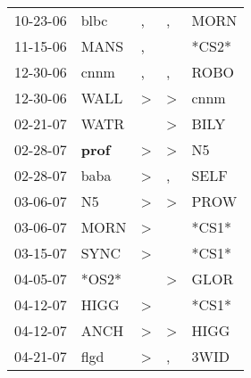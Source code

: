 \begin{supertabular}{p{0.07\textwidth}p{0.06\textwidth}p{0.02\textwidth}p{0.02\textwidth}p{0.06\textwidth}}
          10-23-06\textsuperscript{} &           blbc\textsuperscript{} &                , &                , &           MORN\textsuperscript{} \\
          11-15-06\textsuperscript{} &           MANS\textsuperscript{} &                , &                  &                            *CS2* \\
          12-30-06\textsuperscript{} &           cnnm\textsuperscript{} &                , &                , &           ROBO\textsuperscript{} \\
          12-30-06\textsuperscript{} &           WALL\textsuperscript{} &     \textgreater &     \textgreater &           cnnm\textsuperscript{} \\
          02-21-07\textsuperscript{} &           WATR\textsuperscript{} &                  &     \textgreater &           BILY\textsuperscript{} \\
          02-28-07\textsuperscript{} &  \textbf{prof\textsuperscript{}} &     \textgreater &     \textgreater &             N5\textsuperscript{} \\
          02-28-07\textsuperscript{} &           baba\textsuperscript{} &     \textgreater &                , &           SELF\textsuperscript{} \\
          03-06-07\textsuperscript{} &             N5\textsuperscript{} &     \textgreater &     \textgreater &           PROW\textsuperscript{} \\
          03-06-07\textsuperscript{} &           MORN\textsuperscript{} &     \textgreater &                  &                            *CS1* \\
          03-15-07\textsuperscript{} &           SYNC\textsuperscript{} &     \textgreater &                  &                            *CS1* \\
          04-05-07\textsuperscript{} &                            *OS2* &                  &     \textgreater &           GLOR\textsuperscript{} \\
          04-12-07\textsuperscript{} &           HIGG\textsuperscript{} &     \textgreater &                  &                            *CS1* \\
          04-12-07\textsuperscript{} &           ANCH\textsuperscript{} &     \textgreater &     \textgreater &           HIGG\textsuperscript{} \\
          04-21-07\textsuperscript{} &           flgd\textsuperscript{} &     \textgreater &                , &           3WID\textsuperscript{} \\

\end{supertabular}
